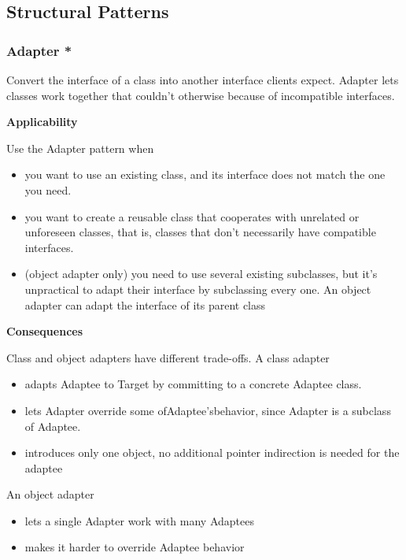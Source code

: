 \documentclass{article}
\begin{document}
\newpage
\subsection{Structural Patterns}
\subsubsection{Adapter *}
Convert the interface of a class into another interface clients expect. Adapter lets classes work together that couldn't otherwise because of incompatible interfaces.


\textbf{Applicability}

Use the Adapter pattern when
\begin{itemize}
    \item you want to use an existing class, and its interface does not match the one you need.
    \item you want to create a reusable class that cooperates with unrelated or unforeseen classes, that is, classes that don't necessarily have compatible interfaces.
    \item (object adapter only) you need to use several existing subclasses, but it's unpractical to adapt their interface by subclassing every one. An object adapter can adapt the interface of its parent class
\end{itemize}

\textbf{Consequences}

Class and object adapters have different trade-offs. A class adapter

\begin{itemize}
    \item adapts Adaptee to Target by committing to a concrete Adaptee class.
    \item lets Adapter override some ofAdaptee'sbehavior, since Adapter is a subclass of Adaptee.
    \item introduces only one object, no additional pointer indirection is needed for the adaptee
\end{itemize}

An object adapter

\begin{itemize}
    \item lets a single Adapter work with many Adaptees
    \item makes it harder to override Adaptee behavior
\end{itemize}
\end{document}

